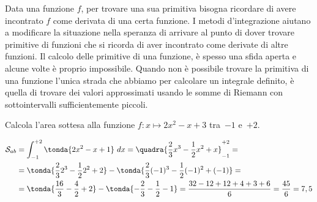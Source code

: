 Data una funzione \(f\), per trovare una sua primitiva bisogna ricordare di 
avere incontrato \(f\) come derivata di una  certa funzione. 
I metodi d'integrazione aiutano a modificare la situazione nella speranza 
di arrivare al punto di dover trovare primitive di funzioni che si ricorda 
di aver incontrato come derivate di altre funzioni. 
Il calcolo delle primitive di una funzione, è spesso una sfida 
aperta e alcune volte è proprio impossibile.
Quando non è possibile trovare la primitiva di una funzione l'unica strada 
che abbiamo per calcolare un integrale definito, è quella di trovare dei 
valori approssimati usando le somme di Riemann con sottointervalli 
sufficientemente piccoli.

\newpage %
\begin{esempio}
Calcola l'area sottesa alla funzione \quad
\(f: x \mapsto 2 x^2 -x +3\) \quad 
tra~\(-1\) e~\(+2\).


\begin{align*}
\mathcal{S}_{ab} &= \int_{-1}^{+2} \tonda{2 x^2 -x +1}~dx = 
   \quadra{\frac{2}{3}x^3 - \frac{1}{2}x^2 + x}_{-1}^{+2} = \\
&= \tonda{\frac{2}{3}2^3 - \frac{1}{2}2^2 + 2} -
     \tonda{\frac{2}{3}(-1)^3 - \frac{1}{2}(-1)^2 +(-1)} = \\
&= \tonda{\frac{16}{3} - \frac{4}{2} + 2} - 
     \tonda{-\frac{2}{3} - \frac{1}{2} -1} = 
   \frac{32 -12 +12 +4 +3 +6}{6} = \frac{45}{6} = 7,5
\end{align*}
\end{esempio}

